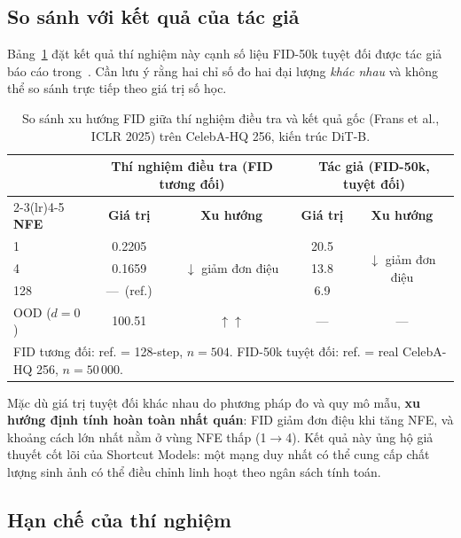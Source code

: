 \subsection{So sánh với kết quả của tác giả}
\label{sec:comparison}

Bảng~\ref{tab:comparison} đặt kết quả thí nghiệm này cạnh số liệu FID-50k tuyệt đối được tác giả báo cáo trong~\cite{Frans2025}. Cần lưu ý rằng hai chỉ số đo hai đại lượng \emph{khác nhau} và không thể so sánh trực tiếp theo giá trị số học.

\begin{table}[h]
\centering
\caption{So sánh xu hướng FID giữa thí nghiệm điều tra và kết quả gốc (Frans et al., ICLR 2025)
trên CelebA-HQ 256, kiến trúc DiT-B.}
\label{tab:comparison}
\begin{tabular}{lcccc}
\toprule
& \multicolumn{2}{c}{\textbf{Thí nghiệm điều tra (FID tương đối)}}
& \multicolumn{2}{c}{\textbf{Tác giả (FID-50k, tuyệt đối)}} \\
\cmidrule(lr){2-3}\cmidrule(lr){4-5}
\textbf{NFE} & \textbf{Giá trị} & \textbf{Xu hướng}
             & \textbf{Giá trị} & \textbf{Xu hướng} \\
\midrule
1   & 0.2205 & \multirow{3}{*}{$\downarrow$ giảm đơn điệu} & 20.5 & \multirow{3}{*}{$\downarrow$ giảm đơn điệu} \\
4   & 0.1659 & & 13.8 & \\
128 & ---\ (ref.) & & 6.9  & \\
\midrule
OOD ($d=0$) & 100.51 & $\uparrow\uparrow$ & --- & --- \\
\bottomrule
\multicolumn{5}{l}{\footnotesize FID tương đối: ref. = 128-step, $n=504$.
FID-50k tuyệt đối: ref. = real CelebA-HQ 256, $n=50\,000$.}
\end{tabular}
\end{table}

\noindent Mặc dù giá trị tuyệt đối khác nhau do phương pháp đo và quy mô mẫu, \textbf{xu hướng định tính hoàn toàn nhất quán}: FID giảm đơn điệu khi tăng NFE, và khoảng cách lớn nhất nằm ở vùng NFE thấp (1$\to$4). Kết quả này ủng hộ giả thuyết cốt lõi của Shortcut Models: một mạng duy nhất có thể cung cấp chất lượng sinh ảnh có thể điều chỉnh linh hoạt theo ngân sách tính toán.

\subsection{Hạn chế của thí nghiệm}
\label{sec:limitations}

